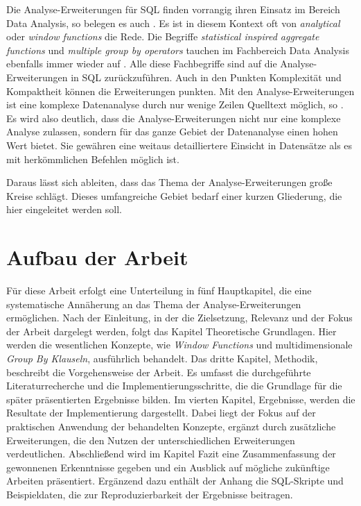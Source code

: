 Die Analyse-Erweiterungen für SQL finden vorrangig ihren Einsatz im Bereich Data
Analysis, so belegen es auch \citet[S. 245]{FOTACHE2015243}. Es ist in diesem Kontext
oft von \textit{analytical} oder \textit{window functions} die Rede. Die
Begriffe \textit{statistical inspired aggregate functions} und \textit{multiple
group by operators} tauchen im Fachbereich Data Analysis ebenfalls immer wieder
auf \citep[vgl.][S. 247 - 248]{FOTACHE2015243}. Alle diese Fachbegriffe sind auf
die Analyse-Erweiterungen in SQL zurückzuführen. Auch in den Punkten Komplexität
und Kompaktheit können die Erweiterungen punkten. Mit den Analyse-Erweiterungen
ist eine komplexe Datenanalyse durch nur wenige Zeilen Quelltext möglich, so \citet[K.
1]{Maue2022}. Es wird also deutlich, dass die Analyse-Erweiterungen nicht nur eine
komplexe Analyse zulassen, sondern für das ganze Gebiet der Datenanalyse einen
hohen Wert bietet. Sie gewähren eine weitaus detailliertere Einsicht in Datensätze
als es mit herkömmlichen Befehlen möglich ist.

Daraus lässt sich ableiten, dass
das Thema der Analyse-Erweiterungen große Kreise schlägt. Dieses umfangreiche
Gebiet bedarf einer kurzen Gliederung, die hier eingeleitet werden soll.

\section{Aufbau der Arbeit}
\label{sec:aufbau_der_arbeit} Für diese Arbeit erfolgt eine Unterteilung in fünf
Hauptkapitel, die eine systematische Annäherung an das Thema der Analyse-Erweiterungen
ermöglichen. Nach der Einleitung, in der die Zielsetzung, Relevanz und der Fokus
der Arbeit dargelegt werden, folgt das Kapitel Theoretische Grundlagen. Hier werden
die wesentlichen Konzepte, wie \textit{Window Functions} und multidimensionale \textit{Group
By Klauseln}, ausführlich behandelt. Das dritte Kapitel, Methodik, beschreibt
die Vorgehensweise der Arbeit. Es umfasst die durchgeführte Literaturrecherche und
die Implementierungsschritte, die die Grundlage für die später präsentierten
Ergebnisse bilden. Im vierten Kapitel, Ergebnisse, werden die Resultate der Implementierung
dargestellt. Dabei liegt der Fokus auf der praktischen Anwendung der behandelten
Konzepte, ergänzt durch zusätzliche Erweiterungen, die den Nutzen der
unterschiedlichen Erweiterungen verdeutlichen. Abschließend wird im Kapitel Fazit
eine Zusammenfassung der gewonnenen Erkenntnisse gegeben und ein Ausblick auf mögliche
zukünftige Arbeiten präsentiert. Ergänzend dazu enthält der Anhang die SQL-Skripte
und Beispieldaten, die zur Reproduzierbarkeit der Ergebnisse beitragen.


